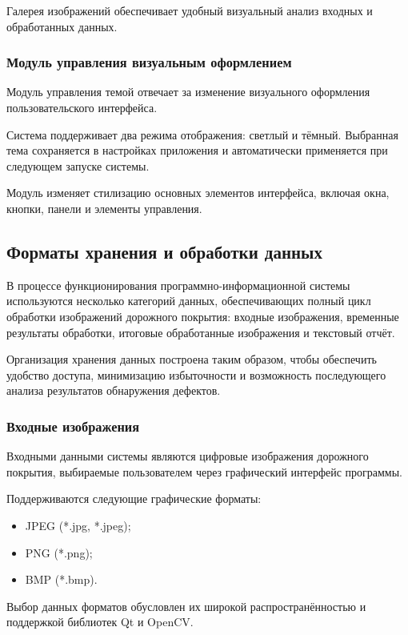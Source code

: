 Галерея изображений обеспечивает удобный визуальный анализ входных и обработанных данных.

\subsubsection{Модуль управления визуальным оформлением}

Модуль управления темой отвечает за изменение визуального оформления пользовательского интерфейса.

Система поддерживает два режима отображения: светлый и тёмный. Выбранная тема сохраняется в настройках приложения и автоматически применяется при следующем запуске системы.

Модуль изменяет стилизацию основных элементов интерфейса, включая окна, кнопки, панели и элементы управления.


\subsection{Форматы хранения и обработки данных}

В процессе функционирования программно-информационной системы используются несколько категорий данных, обеспечивающих полный цикл обработки изображений дорожного покрытия: входные изображения, временные результаты обработки, итоговые обработанные изображения и текстовый отчёт.

Организация хранения данных построена таким образом, чтобы обеспечить удобство доступа, минимизацию избыточности и возможность последующего анализа результатов обнаружения дефектов.

\subsubsection{Входные изображения}

Входными данными системы являются цифровые изображения дорожного покрытия, выбираемые пользователем через графический интерфейс программы.

Поддерживаются следующие графические форматы:

\begin{itemize}
	\item JPEG (*.jpg, *.jpeg);
	\item PNG (*.png);
	\item BMP (*.bmp).
\end{itemize}

Выбор данных форматов обусловлен их широкой распространённостью и поддержкой библиотек Qt и OpenCV.

